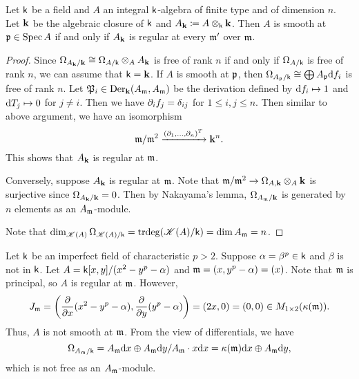     
    \begin{proposition}\label{prop: smoothness is geometric regularity, affine version}
        Let \(\kk\) be a field and \(A\) an integral \(\kk\)-algebra of finite type and of dimension $n$.
        Let \(\kkk\) be the algebraic closure of \(\kk\) and \(A_\kkk \coloneqq A \ten_{\kk} \kkk\).
        Then \(A\) is smooth at \(\frakp \in \Spec A\) if and only if \(A_\kkk\) is regular at every \(\frakm'\) over \(\frakm\).
   \end{proposition}
    \begin{proof}
        Since \(\Omega_{A_\kkk/\kkk} \cong \Omega_{A/\kk} \ten_A A_\kkk\) is free of rank \(n\) if and only if \(\Omega_{A/\kk}\) is free of rank \(n\),
        we can assume that \(\kk = \kkk\).
        If \(A\) is smooth at \(\frakp\), then \(\Omega_{A_\frakp/\kk} \cong \bigoplus A_\frakp \d f_i\) is free of rank \(n\).
        Let \(\frakP_i \in \Der_\kkk(A_\frakm, A_\frakm)\) be the derivation defined by \(\d f_i \mapsto 1\) and \(\d T_j \mapsto 0\) for \(j \neq i\).
        Then we have \(\P_i f_j = \delta_{ij}\) for \(1 \leq i, j \leq n\).
        Then similar to above argument, we have an isomorphism
        \[ \frakm/\frakm^2 \xrightarrow{(\P_1,\ldots,\P_n)^T} \kkk^n. \]
        This shows that \(A_\kkk\) is regular at \(\frakm\).

        Conversely, suppose \(A_\kkk\) is regular at \(\frakm\).
        Note that \(\frakm/\frakm^2 \to \Omega_{A,\kkk} \ten_A \kkk\) is surjective since \(\Omega_{A_\kkk/\kkk} = 0\).
        Then by Nakayama's lemma, \(\Omega_{A_\frakm/\kkk}\) is generated by \(n\) elements as an \(A_\frakm\)-module.
        
        Note that \(\dim_{\fkk(A)} \Omega_{\fkk(A)/\kk} = \trdeg (\fkk(A)/\kk) = \dim A_\frakm = n\).

        

    \end{proof}


    \begin{example}\label{eg: regular but not smooth}
        Let \(\kk\) be an imperfect field of characteristic \(p > 2\).
        Suppose \(\alpha = \beta^p \in \kk\) and \(\beta\) is not in \(\kk\).
        Let \(A = \kk[x,y]/(x^2 - y^p - \alpha)\) and \(\frakm = (x, y^p-\alpha) = (x)\).
        Note that \(\frakm\) is principal, so \(A\) is regular at \(\frakm\).
        However, 
        \[ J_\frakm = \left( \frac{\P }{\P x}(x^2-y^p-\alpha), \frac{\P}{\P y}(y^p-\alpha) \right) = \left( 2x, 0 \right) = (0,0) \in M_{1\times 2}(\rkk(\frakm)). \]
        Thus, \(A\) is not smooth at \(\frakm\).
        From the view of differentials, we have
        \[ \Omega_{A_\frakm/\kk} = A_\frakm \d x \oplus A_\frakm \d y / A_\frakm \cdot x\d x = \rkk(\frakm) \d x \oplus A_\frakm \d y, \]
        which is not free as an \(A_\frakm\)-module.
    \end{example}

